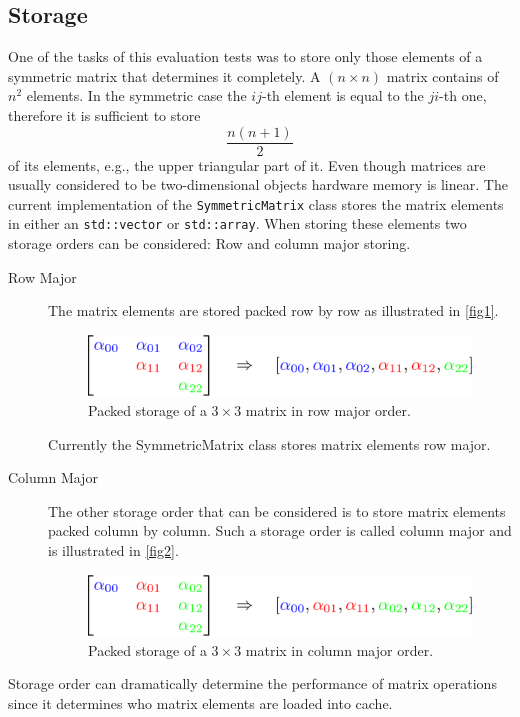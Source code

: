 \documentclass[a4wide]{scrartcl}
\begin{document}
\subsection{Storage}
One of the tasks of this evaluation tests was to store only those elements of a symmetric matrix that determines it completely. A $(n \times n)$ matrix contains of $n^2$ elements. In the symmetric case the $ij$-th element is equal to the $ji$-th one, therefore it is sufficient to store
\[
\frac{n(n+1)}{2}    
\]
of its elements, e.g., the upper triangular part of it. Even though matrices are usually considered to be two-dimensional objects hardware memory is linear. The current implementation of the \texttt{SymmetricMatrix} class stores the matrix elements in either an \texttt{std::vector} or \texttt{std::array}. When storing these elements two storage orders can be considered: Row and column major storing.
\begin{description}
    \item[Row Major] The matrix elements are stored packed row by row as illustrated in \autoref{fig1}.
    \begin{figure}
    \centering
        \includegraphics[scale=0.35]{img/RowMajor.pdf}
        \caption{Packed storage of a $3 \times 3$ matrix in row major order.}
        \label{fig1}
    \end{figure}
    Currently the SymmetricMatrix class stores matrix elements row major.
    \item[Column Major] The other storage order that can be considered is to store matrix elements packed column by column. Such a storage order is called column major and is illustrated in \autoref{fig2}.
    \begin{figure}
    \centering
        \includegraphics[scale=0.35]{img/ColumnMajor.pdf}
        \caption{Packed storage of a $3 \times 3$ matrix in column major order.}
        \label{fig2}
    \end{figure}
\end{description}
Storage order can dramatically determine the performance of matrix operations since it determines who matrix elements are loaded into cache. 
\end{document}
